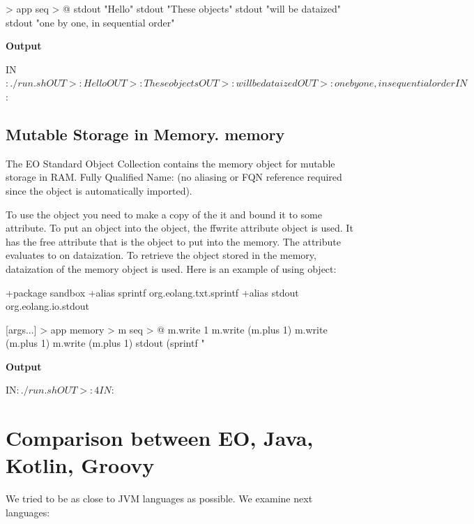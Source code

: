 \documentclass[12pt]{book}
\begin{document}
{{{\begin{ffcode}
[args...] > app
  seq > @
    stdout "Hello\n"
    stdout "These objects\n"
    stdout "will be dataized\n"
    stdout "one by one, in sequential order\n"
\end{ffcode}
\textbf{Output}
\begin{ffcode}
IN$: ./run.sh
OUT>: Hello
OUT>: These objects
OUT>: will be dataized
OUT>: one by one, in sequential order
IN$: 
\end{ffcode}

\section{Mutable Storage in Memory. memory}
The EO Standard Object Collection contains the memory object for mutable storage in RAM.
Fully Qualified Name:  (no aliasing or FQN reference required since the object is automatically imported).

To use the  object you need to make a copy of the it and bound it to some attribute.
To put an object into the  object, the 
ff{write} attribute object is used. It has the  free attribute that is the object to put into the memory. The  attribute evaluates to  on dataization.
To retrieve the object stored in the memory, dataization of the memory object is used. Here is an example of using  object:

\begin{ffcode}
+package sandbox
+alias sprintf org.eolang.txt.sprintf
+alias stdout org.eolang.io.stdout

[args...] > app
  memory > m
  seq > @
    m.write 1
    m.write (m.plus 1)
    m.write (m.plus 1)
    m.write (m.plus 1)
    stdout (sprintf "%
\end{ffcode}
\textbf{Output}
\begin{ffcode}
IN$: ./run.sh
OUT>: 4
IN$: 
\end{ffcode}


\chapter{Comparison between EO, Java, Kotlin, Groovy}
We tried to be as close to JVM languages as possible.
We examine next languages:

}}}
\end{document}

